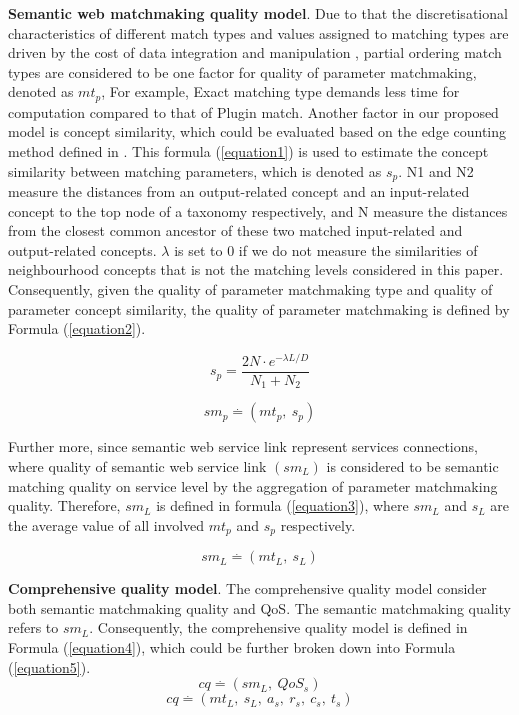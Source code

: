 \documentclass{llncs}
\begin{document}
\textbf{Semantic web matchmaking quality model}. Due to that the discretisational characteristics of different match types and values assigned to matching types are driven by the cost of data integration and manipulation \cite{lecue2009optimizing}, partial ordering match types are considered to be one factor for quality of parameter matchmaking, denoted as $mt_{p}$,  For example, Exact matching type demands less time for computation compared to that of Plugin match. Another factor in our proposed model is concept similarity, which could be evaluated based on the edge counting method defined in \cite{shet2012new}. This formula (\ref{equation1}) is used to estimate the concept similarity between matching parameters, which is denoted as $s_{p}$. N1 and N2 measure the distances from an output-related concept and an input-related concept to the top node of a taxonomy respectively, and N measure the distances from the closest common ancestor of these two matched input-related and output-related concepts. $\lambda$ is set to 0 if we do not measure the similarities of neighbourhood concepts that is not the matching levels considered in this paper. Consequently, given the quality of parameter matchmaking type and quality of parameter concept similarity, the quality of parameter matchmaking is defined by Formula (\ref{equation2}).

\begin{equation}
s_{p}{=} \frac{2N \cdot e^{-\lambda L/D} }{N_{1}+N_{2}}
\label{equation1}
\end{equation}

\begin{equation}
\label{equation2}
sm_{p} \stackrel{.}{=} (mt_ {p}, \  s_ {p})
\end{equation}

Further more, since semantic web service link represent services connections, where quality of semantic web service link $(sm_{L})$ is considered to be semantic matching quality on service level by the aggregation of parameter matchmaking quality. Therefore, $sm_{L}$ is defined in formula (\ref{equation3}), where $sm_{L}$ and $s_{L}$ are the average value of all involved $mt_{p}$ and $s_{p}$ respectively. 

\begin{equation}
\label{equation3}
sm_{L} \stackrel{.}{=} (mt_ {L}, \  s_ {L})
\end{equation}

\textbf{Comprehensive quality model}. The comprehensive quality model consider both semantic matchmaking quality and QoS. The semantic matchmaking quality refers to $sm_{L}$. Consequently, the comprehensive quality model is defined in Formula (\ref{equation4}), which could be further broken down into Formula (\ref{equation5}). 
\begin{equation}
\label{equation4}
cq \stackrel{.}{=} (sm_ {L}, \  QoS_ {s})
\end{equation}
\begin{equation}
\label{equation5}
cq \stackrel{.}{=} (mt_ {L}, \  s_ {L}, \  a_{s},\  r_{s},\  c_{s},\  t_{s})
\end{equation}
\end{document}
